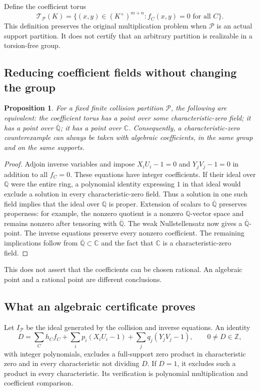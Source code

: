 \documentclass[11pt,a4paper,oneside]{report}
\newtheorem{proposition}[theorem]{Proposition}
\theoremstyle{definition}
\theoremstyle{remark}
\newcommand{\C}{\mathbb C}
\newcommand{\Q}{\mathbb Q}
\newcommand{\Qbar}{\overline{\mathbb Q}}
\newcommand{\Z}{\mathbb Z}
\begin{document}
Define the coefficient torus
\[
\mathcal T_{\mathcal P}(K)=
\{(x,y)\in(K^\times)^{m+n}: f_C(x,y)=0\text{ for all }C\}.
\]
This definition preserves the original multiplication problem when
$\mathcal P$ is an actual support partition. It does not certify that an
arbitrary partition is realizable in a torsion-free group.

\subsection{Reducing coefficient fields without changing the group}

\begin{proposition}\label{M01:prop:field}
For a fixed finite collision partition $\mathcal P$, the following are
equivalent: the coefficient torus has a point over some characteristic-zero
field; it has a point over $\Qbar$; it has a point over $\C$.
Consequently, a characteristic-zero counterexample can always be taken
with algebraic coefficients, in the same group and on the same supports.
\end{proposition}
\begin{proof}
Adjoin inverse variables and impose $X_iU_i-1=0$ and $Y_jV_j-1=0$ in
addition to all $f_C=0$. These equations have integer coefficients.
If their ideal over $\Q$ were the entire ring, a polynomial identity
expressing $1$ in that ideal would exclude a solution in every
characteristic-zero field. Thus a solution in one such field implies that
the ideal over $\Q$ is proper. Extension of scalars to $\Qbar$ preserves
properness: for example, the nonzero quotient is a nonzero $\Q$-vector
space and remains nonzero after tensoring with $\Qbar$. The weak
Nullstellensatz now gives a $\Qbar$-point. The inverse equations preserve
every nonzero coefficient. The remaining implications follow from
$\Qbar\subset\C$ and the fact that $\C$ is a characteristic-zero field.
\end{proof}

This does not assert that the coefficients can be chosen rational.
An algebraic point and a rational point are different conclusions.

\subsection{What an algebraic certificate proves}

Let $I_{\mathcal P}$ be the ideal generated by the collision and inverse
equations. An identity
\begin{equation}\label{M01:eq:integercert}
D=\sum_C h_C f_C+\sum_i p_i(X_iU_i-1)
       +\sum_j q_j(Y_jV_j-1),\qquad 0\ne D\in\Z,
\end{equation}
with integer polynomials, excludes a full-support zero product in
characteristic zero and in every characteristic not dividing $D$.
If $D=1$, it excludes such a product in every characteristic.
Its verification is polynomial multiplication and coefficient comparison.
\end{document}
